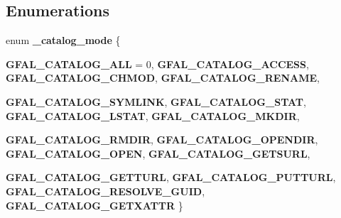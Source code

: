 \subsection*{Enumerations}
\begin{CompactItemize}
\item 
enum \textbf{\_\-catalog\_\-mode} \{ \par
\textbf{GFAL\_\-CATALOG\_\-ALL} = 0, 
\textbf{GFAL\_\-CATALOG\_\-ACCESS}, 
\textbf{GFAL\_\-CATALOG\_\-CHMOD}, 
\textbf{GFAL\_\-CATALOG\_\-RENAME}, 
\par
\textbf{GFAL\_\-CATALOG\_\-SYMLINK}, 
\textbf{GFAL\_\-CATALOG\_\-STAT}, 
\textbf{GFAL\_\-CATALOG\_\-LSTAT}, 
\textbf{GFAL\_\-CATALOG\_\-MKDIR}, 
\par
\textbf{GFAL\_\-CATALOG\_\-RMDIR}, 
\textbf{GFAL\_\-CATALOG\_\-OPENDIR}, 
\textbf{GFAL\_\-CATALOG\_\-OPEN}, 
\textbf{GFAL\_\-CATALOG\_\-GETSURL}, 
\par
\textbf{GFAL\_\-CATALOG\_\-GETTURL}, 
\textbf{GFAL\_\-CATALOG\_\-PUTTURL}, 
\textbf{GFAL\_\-CATALOG\_\-RESOLVE\_\-GUID}, 
\textbf{GFAL\_\-CATALOG\_\-GETXATTR}
 \}
\end{CompactItemize}
